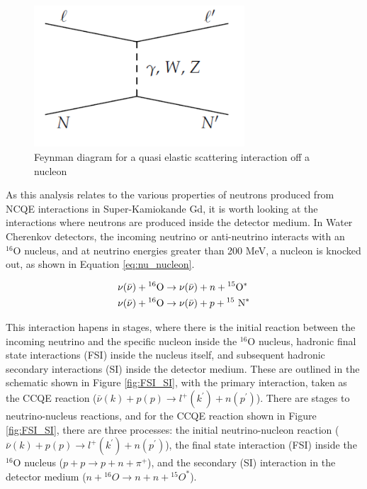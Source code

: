 \begin{figure}
    \centering
    \includegraphics[width=0.7\textwidth]{Figures/QE_feynman.png}
    \caption{Feynman diagram for a quasi elastic scattering interaction off a nucleon}
    \label{fig:QE_reaction}
\end{figure}



As this analysis relates to the various properties of neutrons produced from NCQE interactions in Super-Kamiokande Gd, it is worth looking at the interactions where neutrons are produced inside the detector medium. In Water Cherenkov detectors, the incoming neutrino or anti-neutrino interacts with an ${ }^{16} \mathrm{O}$ nucleus, and at neutrino energies greater than 200 MeV, a nucleon is knocked out, as shown in Equation \ref{eq:nu_nucleon}.

\begin{align}
&\nu(\bar{\nu})+{ }^{16} \mathrm{O} \rightarrow \nu(\bar{\nu})+n+{ }^{15} \mathrm{O}^{*} \label{eq:nu_nucleon} \\
&\nu(\bar{\nu})+{ }^{16} \mathrm{O} \rightarrow \nu(\bar{\nu})+p+{ }^{15} \mathrm{~N}^{*} \notag
\end{align}


This interaction hapens in stages, where there is the initial reaction between the incoming neutrino and the specific nucleon inside the ${ }^{16} \mathrm{O}$ nucleus, hadronic final state interactions (FSI) inside the nucleus itself, and subsequent hadronic secondary interactions (SI) inside the detector medium. These are outlined in the schematic shown in Figure \ref{fig:FSI_SI}, with the primary interaction, taken as the CCQE reaction ($\bar{\nu}(k)+p(p) \rightarrow l^{+}\left(k^{\prime}\right)+n\left(p^{\prime}\right)$).
There are stages to neutrino-nucleus reactions, and for the CCQE reaction shown in Figure \ref{fig:FSI_SI}, there are three processes: the initial neutrino-nucleon reaction ($\bar{\nu}(k)+p(p) \rightarrow l^{+}\left(k^{\prime}\right)+n\left(p^{\prime}\right)$), the final state interaction (FSI) \cite{Golan_2012} inside the ${ }^{16} \mathrm{O}$ nucleus ($p+p \rightarrow p+n+\pi^{+}$), and the secondary (SI) interaction \cite{haigh2015results} in the detector medium ($n+{ }^{16} O \rightarrow n+n+{ }^{15} O^{*}$).


